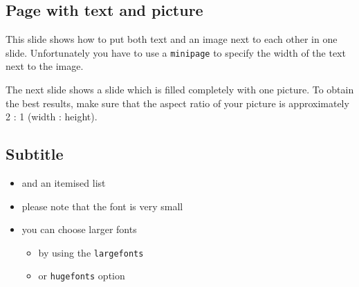 \documentclass[a4paper]{article}            %
\begin{document}
\begin{slidetop}


\begin{minipage}{12cm}   %
\section*{Page with text and picture}

This slide shows how to put both text and an image next to each other in one slide. Unfortunately you have to use a \verb|minipage| to specify the width of the text next to the image.

The next slide shows a slide which is filled completely with one picture. To obtain the best results, make sure that the aspect ratio of your picture is approximately 2 : 1 (width : height).
\end{minipage}
\end{slidetop}


\begin{slidetop}
\section*{Subtitle}

\begin{itemize}
\item and an itemised list
\item please note that the font is very small
\item you can choose larger fonts
\begin{itemize}
\item by using the \verb|largefonts|
\item or \verb|hugefonts| option
\end{itemize}
\end{itemize}
\end{slidetop}
\end{document}
